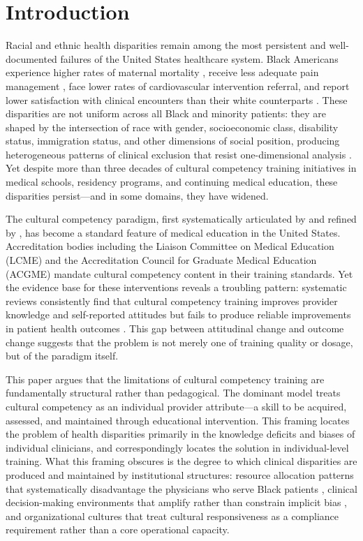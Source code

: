\documentclass[12pt, a4paper]{article}
\begin{document}
\section{Introduction}

Racial and ethnic health disparities remain among the most persistent and well-documented failures of the United States healthcare system. Black Americans experience higher rates of maternal mortality \citep{petersen2019}, receive less adequate pain management \citep{hoffman2016}, face lower rates of cardiovascular intervention referral, and report lower satisfaction with clinical encounters than their white counterparts \citep{smedley2003}. These disparities are not uniform across all Black and minority patients: they are shaped by the intersection of race with gender, socioeconomic class, disability status, immigration status, and other dimensions of social position, producing heterogeneous patterns of clinical exclusion that resist one-dimensional analysis \citep{krieger2012}. Yet despite more than three decades of cultural competency training initiatives in medical schools, residency programs, and continuing medical education, these disparities persist---and in some domains, they have widened.

The cultural competency paradigm, first systematically articulated by \citet{cross1989} and refined by \citet{betancourt2003}, has become a standard feature of medical education in the United States. Accreditation bodies including the Liaison Committee on Medical Education (LCME) and the Accreditation Council for Graduate Medical Education (ACGME) mandate cultural competency content in their training standards. Yet the evidence base for these interventions reveals a troubling pattern: systematic reviews consistently find that cultural competency training improves provider knowledge and self-reported attitudes but fails to produce reliable improvements in patient health outcomes \citep{beach2005, lie2011, truong2014}. This gap between attitudinal change and outcome change suggests that the problem is not merely one of training quality or dosage, but of the paradigm itself.

This paper argues that the limitations of cultural competency training are fundamentally structural rather than pedagogical. The dominant model treats cultural competency as an individual provider attribute---a skill to be acquired, assessed, and maintained through educational intervention. This framing locates the problem of health disparities primarily in the knowledge deficits and biases of individual clinicians, and correspondingly locates the solution in individual-level training. What this framing obscures is the degree to which clinical disparities are produced and maintained by institutional structures: resource allocation patterns that systematically disadvantage the physicians who serve Black patients \citep{bach2004}, clinical decision-making environments that amplify rather than constrain implicit bias \citep{hall2015}, and organizational cultures that treat cultural responsiveness as a compliance requirement rather than a core operational capacity.
\end{document}

